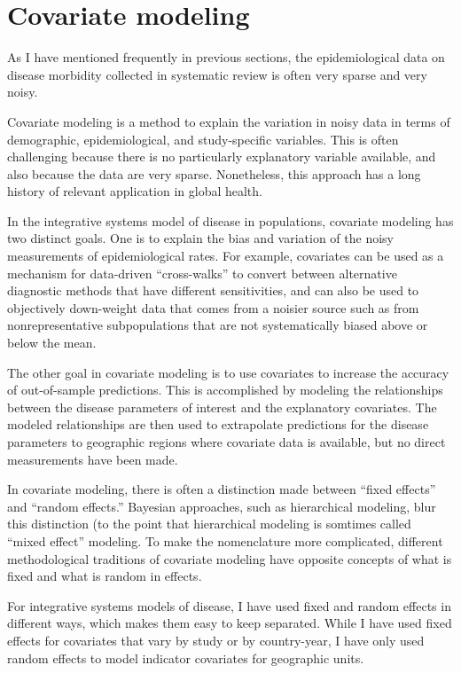 \chapter{Covariate modeling}
\label{theory-covariate_modeling}
As I have mentioned frequently in previous sections, the
epidemiological data on disease morbidity collected in systematic
review is often very sparse and very noisy.

Covariate modeling is a method to explain the variation in noisy
data in terms of demographic, epidemiological, and study-specific
variables.  This is often challenging because there is no particularly
explanatory variable available, and also because the data are very
sparse.  Nonetheless, this approach has a long history of relevant
application in global health.\cite{girosi_demographic_2008,jon_wakefield_bayesian_1996}

In the integrative systems model of disease in populations, covariate
modeling has two distinct goals.  One is to
explain the bias and variation of the noisy measurements of
epidemiological rates.  For example, covariates can be used as a mechanism
for data-driven ``cross-walks'' to convert between alternative diagnostic methods
that have different sensitivities, and can also be used to
objectively down-weight data that comes from a noisier source such as
from nonrepresentative subpopulations that are not systematically
biased above or below the mean.

The other goal in covariate modeling is to use covariates
to increase the accuracy of out-of-sample predictions.  This
is accomplished by modeling the relationships between the disease
parameters of interest and the explanatory covariates. The modeled
relationships are then used to extrapolate predictions for the disease
parameters to geographic regions where covariate data is available,
but no direct measurements have been made.

In covariate modeling, there is often a distinction made between
``fixed effects'' and ``random effects.''  Bayesian approaches, such
as hierarchical modeling, blur this distinction (to the point that
hierarchical modeling is somtimes called ``mixed effect'' modeling.
\cite{Gelman_Multilevel_2005}  To make the nomenclature more
complicated, different methodological traditions of covariate modeling
have opposite concepts of what is fixed and what is random in effects.

For integrative systems models of disease, I have used fixed and
random effects in different ways, which makes them easy to keep
separated.  While I have used fixed effects for covariates that vary
by study or by country-year, I have only used random effects to model
indicator covariates for geographic units.

